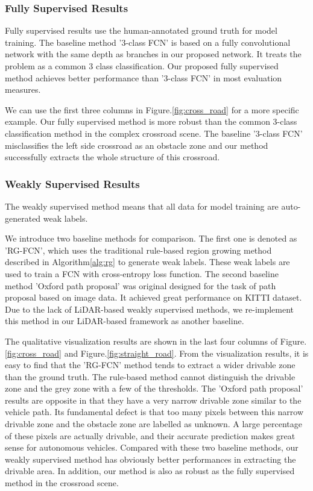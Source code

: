 \documentclass[letterpaper, 10 pt, conference]{ieeeconf}  %
\begin{document}
\subsubsection{Fully Supervised Results}
Fully supervised results use the human-annotated ground truth for model training. The baseline method '3-class FCN' is based on a fully convolutional network\cite{long2015fully} with the same depth as branches in our proposed network. It treats the problem as a common 3 class classification. Our proposed fully supervised method achieves better performance than '3-class FCN' in most evaluation measures.

We can use the first three columns in Figure.\ref{fig:cross_road} for a more specific example. Our fully supervised method is more robust than the common 3-class classification method in the complex crossroad scene. The baseline '3-class FCN' misclassifies the left side crossroad as an obstacle zone and our method successfully extracts the whole structure of this crossroad.

\subsubsection{Weakly Supervised Results}
The weakly supervised method means that all data for model training are auto-generated weak labels.

We introduce two baseline methods for comparison. The first one is denoted as 'RG-FCN', which uses the traditional rule-based region growing method described in Algorithm\ref{alg:rg} to generate weak labels. These weak labels are used to train a FCN\cite{long2015fully} with cross-entropy loss function. The second baseline method 'Oxford path proposal'\cite{barnes2017find} was original designed for the task of path proposal based on image data. It achieved great performance on KITTI dataset\cite{geiger2013vision}. Due to the lack of LiDAR-based weakly supervised methods, we re-implement this method in our LiDAR-based framework as another baseline.

The qualitative visualization results are shown in the last four columns of Figure.\ref{fig:cross_road} and Figure.\ref{fig:straight_road}. From the visualization results, it is easy to find that the 'RG-FCN' method tends to extract a wider drivable zone than the ground truth. The rule-based method cannot distinguish the drivable zone and the grey zone with a few of the thresholds. The 'Oxford path proposal' results are opposite in that they have a very narrow drivable zone similar to the vehicle path. Its fundamental defect is that too many pixels between this narrow drivable zone and the obstacle zone are labelled as unknown. A large percentage of these pixels are actually drivable, and their accurate prediction makes great sense for autonomous vehicles. Compared with these two baseline methods, our weakly supervised method has obviously better performances in extracting the drivable area. In addition, our method is also as robust as the fully supervised method in the crossroad scene.
\end{document}
